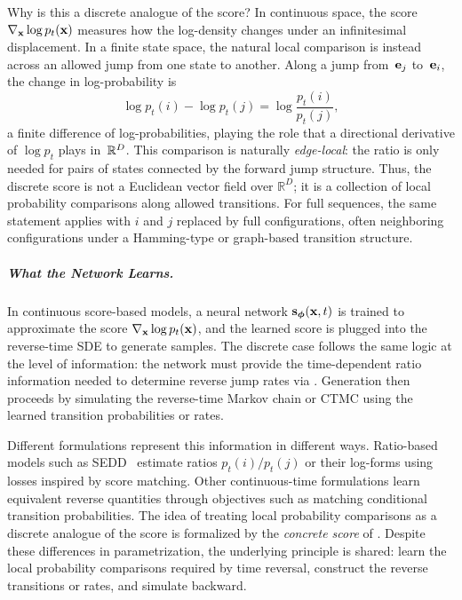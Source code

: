 Why is this a discrete analogue of the score?  In continuous space, the
score $\nabla_{{\mathbf{x}}}\log p_t({\mathbf{x}})$ measures how the log-density changes
under an infinitesimal displacement.  In a finite state space, the
natural local comparison is instead across an allowed jump from one state
to another.  Along a jump from~${\mathbf{e}}_j$ to~${\mathbf{e}}_i$, the change in
log-probability is
\[
\log p_t(i) - \log p_t(j)
= \log \frac{p_t(i)}{p_t(j)},
\]
a finite difference of log-probabilities, playing the role that a
directional derivative of $\log p_t$ plays in~$\mathbb{R}^D$. This comparison is naturally \emph{edge-local}: the ratio is only needed for
pairs of states connected by the forward jump structure.  Thus, the discrete
score is not a Euclidean vector field over $\mathbb{R}^D$; it is a collection
of local probability comparisons along allowed transitions. For full sequences, the same statement applies with $i$ and $j$ replaced by full configurations, often neighboring configurations under a Hamming-type or graph-based transition structure.

\subparagraph{What the Network Learns.}
In continuous score-based models, a neural network
${\mathbf{s}}_{\bm{\phi}}({\mathbf{x}}, t)$ is trained to approximate the score
$\nabla_{{\mathbf{x}}}\log p_t({\mathbf{x}})$, and the learned score is plugged into
the reverse-time SDE to generate samples. The discrete case follows the
same logic at the level of information: the network must provide the time-dependent ratio information
needed to determine reverse jump rates via
. Generation then proceeds by simulating
the reverse-time Markov chain or CTMC using the learned transition probabilities or rates.

Different formulations represent this information in different ways. Ratio-based models such as SEDD~\citep{lou2024discrete}
estimate ratios $p_t(i)/p_t(j)$ or their log-forms using losses inspired
by score matching. Other continuous-time formulations
\citep{campbell2022continuous,sun2023scorebased} learn equivalent
reverse quantities through objectives such as matching conditional transition probabilities. The idea of treating
local probability comparisons as a discrete analogue of the score is
formalized by the \emph{concrete score} of \citet{meng2022concrete}.
Despite these differences in parametrization, the underlying principle
is shared: learn the local probability comparisons required by time reversal, construct the
reverse transitions or rates, and simulate backward.


